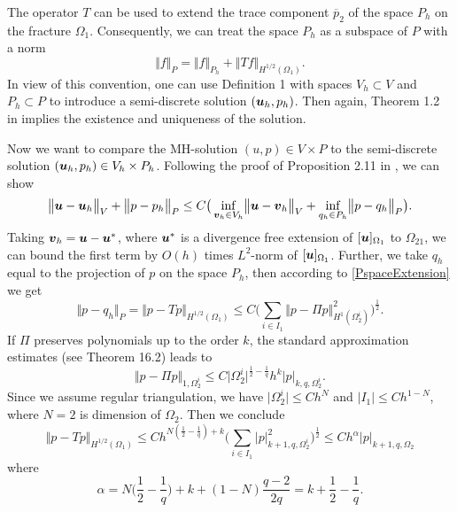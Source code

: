 \documentclass{Mamern09}
\def\vc#1{\mathbf{\boldsymbol{#1}}}     %
\def\abs#1{\lvert#1\rvert}
\def\norm#1{\bigl\Vert#1\bigr\Vert} %
\def\ol#1{\overline{#1}}
\begin{document}
The operator $T$ can be used to extend the trace component $\ol{p}_2$ of the space $P_h$ on the fracture $\Omega_1$. Consequently, we  can treat the space $P_h$ as a subspace of $P$ with a norm
\begin{equation}\label{PspaceExtension}
 	\norm{f}_P=\norm{f}_{P_h}+\norm{T f}_{H^{1/2}(\Omega_1)}.
\end{equation}
In view of this convention, one can use Definition 1 with spaces $V_h \subset V$ and $P_h\subset P$ to introduce a semi-discrete solution $(\vl_h,p_h)$. Then again,
Theorem 1.2 in \cite{Brezzi} implies the existence and uniqueness of the solution.

Now we want to compare the MH-solution $(u,p)\in V\times P$ to the semi-discrete solution $(\vl_h,p_h)\in V_h\times P_h$. Following the proof of Proposition 2.11 in \cite{Brezzi}, we can show
\begin{equation}\label{MainEst}
 	\norm{\vl-\vl_h}_V + \norm{p-p_h}_P \le C\big(
 		\inf_{\vc v_h \in V_h}\norm{\vl - \vc v_h}_{V} + \inf_{q_h\in P_h}\norm{p-q_h}_{P}
                \big).
\end{equation}
Taking $\vc v_h=\vl-\vl^*$, where $\vl^*$ is a divergence free extension of $[\vl]_{\Omega_1}$
to $\Omega_{21}$, we can bound the first term by $O(h)$ times $L^2$-norm of $[\vl]_{\Omega_1}$.
Further, we take $q_h$ equal to the projection of $p$ on the space $P_h$, then according to \eqref{PspaceExtension} we get
\[
  \norm{p-q_h}_{P} = \norm{p-T p}_{H^{1/2}(\Omega_1)}\le C\Big(\sum_{i\in I_1} \norm{p - \Pi p}_{H^1(\Omega_2^i)}^2\Big) ^\frac12.
\]
If $\Pi$ preserves polynomials up to the order $k$, the standard approximation estimates
(see \cite{FEMHandbook} Theorem 16.2) leads to
\[
 \norm{p-\Pi p}_{1,\Omega_2^i}\le C\abs{\Omega_2^i}^{\frac12-\frac1q} h^k \abs{p}_{k,q,\Omega_2^i}.
\]
Since we assume regular triangulation, we have $\abs{\Omega_2^i}\le C h^N$ and $\abs{I_1} \le C h^{1-N}$,
where $N=2$ is dimension of $\Omega_2$.
Then we conclude
\[
        \norm{p-Tp}_{H^{1/2}(\Omega_1)}\le C h^{N(\frac12-\frac1q)+k}\Big(\sum_{i\in I_1} \abs{p}_{k+1,q,\Omega_2^i}^2 \Big)^\frac12\le
        C h^\alpha \abs{p}_{k+1,q,\Omega_2}
\]
where 
\begin{equation}\label{ApproxOrder}
        \alpha= N\Big(\frac12-\frac1q\Big)+k+(1-N)\frac{q-2}{2q}=k+\frac{1}{2}-\frac{1}{q}.
\end{equation}
\end{document}

